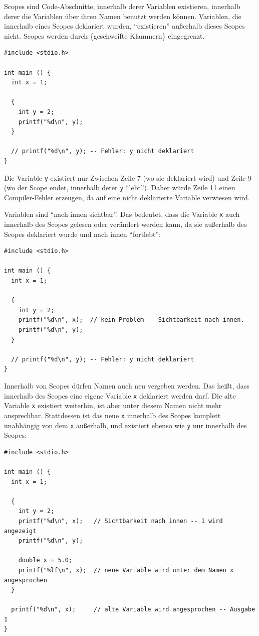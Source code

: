 Scopes sind Code-Abschnitte, innerhalb derer Variablen existieren, \ie innerhalb derer die Variablen über ihren Namen benutzt werden können. Variablen, die innerhalb eines Scopes deklariert wurden, \enquote{existieren} außerhalb dieses Scopes nicht. Scopes werden durch \{geschweifte Klammern\} eingegrenzt.

\begin{codebox}
\begin{verbatim}
#include <stdio.h>

int main () {
  int x = 1;
  
  {
    int y = 2;
    printf("%d\n", y);
  }
  
  // printf("%d\n", y); -- Fehler: y nicht deklariert
}
\end{verbatim}
\end{codebox}

Die Variable \texttt{y} existiert nur Zwischen Zeile 7 (wo sie deklariert wird) und Zeile 9 (wo der Scope endet, innerhalb derer \texttt{y} \enquote{lebt}). Daher würde Zeile 11 einen Compiler-Fehler erzeugen, da auf eine nicht deklarierte Variable verwiesen wird.

Variablen sind \enquote{nach innen sichtbar}. Das bedeutet, dass die Variable \texttt{x} auch innerhalb des Scopes gelesen oder verändert werden kann, da sie außerhalb des Scopes deklariert wurde und nach innen \enquote{fortlebt}:

\begin{codebox}
\begin{verbatim}
#include <stdio.h>

int main () {
  int x = 1;
  
  {
    int y = 2;
    printf("%d\n", x);  // kein Problem -- Sichtbarkeit nach innen.
    printf("%d\n", y);
  }
  
  // printf("%d\n", y); -- Fehler: y nicht deklariert
}
\end{verbatim}
\end{codebox}

Innerhalb von Scopes dürfen Namen auch neu vergeben werden. Das heißt, dass innerhalb des Scopes eine eigene Variable \texttt{x} deklariert werden darf. Die alte Variable \texttt{x} existiert weiterhin, ist aber unter diesem Namen nicht mehr ansprechbar. Stattdessen ist das neue \texttt{x} innerhalb des Scopes komplett unabhängig von dem \texttt{x} außerhalb, und existiert ebenso wie \texttt{y} nur innerhalb des Scopes:

\begin{codebox}
\begin{verbatim}
#include <stdio.h>

int main () {
  int x = 1;
  
  {
    int y = 2;
    printf("%d\n", x);   // Sichtbarkeit nach innen -- 1 wird angezeigt
    printf("%d\n", y);
    
    double x = 5.0;
    printf("%lf\n", x);  // neue Variable wird unter dem Namen x angesprochen
  }
  
  printf("%d\n", x);     // alte Variable wird angesprochen -- Ausgabe 1
}
\end{verbatim}
\end{codebox}


